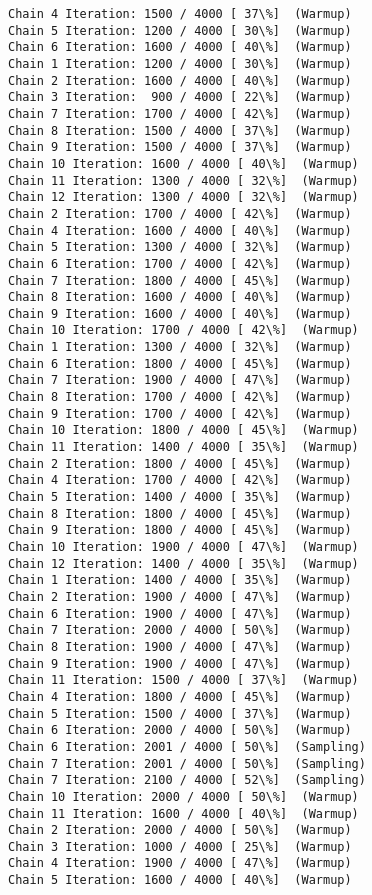 \documentclass[11pt]{article}
\begin{document}
\begin{Verbatim}[commandchars=\\\{\}]
Chain 4 Iteration: 1500 / 4000 [ 37\%]  (Warmup)
Chain 5 Iteration: 1200 / 4000 [ 30\%]  (Warmup)
Chain 6 Iteration: 1600 / 4000 [ 40\%]  (Warmup)
Chain 1 Iteration: 1200 / 4000 [ 30\%]  (Warmup)
Chain 2 Iteration: 1600 / 4000 [ 40\%]  (Warmup)
Chain 3 Iteration:  900 / 4000 [ 22\%]  (Warmup)
Chain 7 Iteration: 1700 / 4000 [ 42\%]  (Warmup)
Chain 8 Iteration: 1500 / 4000 [ 37\%]  (Warmup)
Chain 9 Iteration: 1500 / 4000 [ 37\%]  (Warmup)
Chain 10 Iteration: 1600 / 4000 [ 40\%]  (Warmup)
Chain 11 Iteration: 1300 / 4000 [ 32\%]  (Warmup)
Chain 12 Iteration: 1300 / 4000 [ 32\%]  (Warmup)
Chain 2 Iteration: 1700 / 4000 [ 42\%]  (Warmup)
Chain 4 Iteration: 1600 / 4000 [ 40\%]  (Warmup)
Chain 5 Iteration: 1300 / 4000 [ 32\%]  (Warmup)
Chain 6 Iteration: 1700 / 4000 [ 42\%]  (Warmup)
Chain 7 Iteration: 1800 / 4000 [ 45\%]  (Warmup)
Chain 8 Iteration: 1600 / 4000 [ 40\%]  (Warmup)
Chain 9 Iteration: 1600 / 4000 [ 40\%]  (Warmup)
Chain 10 Iteration: 1700 / 4000 [ 42\%]  (Warmup)
Chain 1 Iteration: 1300 / 4000 [ 32\%]  (Warmup)
Chain 6 Iteration: 1800 / 4000 [ 45\%]  (Warmup)
Chain 7 Iteration: 1900 / 4000 [ 47\%]  (Warmup)
Chain 8 Iteration: 1700 / 4000 [ 42\%]  (Warmup)
Chain 9 Iteration: 1700 / 4000 [ 42\%]  (Warmup)
Chain 10 Iteration: 1800 / 4000 [ 45\%]  (Warmup)
Chain 11 Iteration: 1400 / 4000 [ 35\%]  (Warmup)
Chain 2 Iteration: 1800 / 4000 [ 45\%]  (Warmup)
Chain 4 Iteration: 1700 / 4000 [ 42\%]  (Warmup)
Chain 5 Iteration: 1400 / 4000 [ 35\%]  (Warmup)
Chain 8 Iteration: 1800 / 4000 [ 45\%]  (Warmup)
Chain 9 Iteration: 1800 / 4000 [ 45\%]  (Warmup)
Chain 10 Iteration: 1900 / 4000 [ 47\%]  (Warmup)
Chain 12 Iteration: 1400 / 4000 [ 35\%]  (Warmup)
Chain 1 Iteration: 1400 / 4000 [ 35\%]  (Warmup)
Chain 2 Iteration: 1900 / 4000 [ 47\%]  (Warmup)
Chain 6 Iteration: 1900 / 4000 [ 47\%]  (Warmup)
Chain 7 Iteration: 2000 / 4000 [ 50\%]  (Warmup)
Chain 8 Iteration: 1900 / 4000 [ 47\%]  (Warmup)
Chain 9 Iteration: 1900 / 4000 [ 47\%]  (Warmup)
Chain 11 Iteration: 1500 / 4000 [ 37\%]  (Warmup)
Chain 4 Iteration: 1800 / 4000 [ 45\%]  (Warmup)
Chain 5 Iteration: 1500 / 4000 [ 37\%]  (Warmup)
Chain 6 Iteration: 2000 / 4000 [ 50\%]  (Warmup)
Chain 6 Iteration: 2001 / 4000 [ 50\%]  (Sampling)
Chain 7 Iteration: 2001 / 4000 [ 50\%]  (Sampling)
Chain 7 Iteration: 2100 / 4000 [ 52\%]  (Sampling)
Chain 10 Iteration: 2000 / 4000 [ 50\%]  (Warmup)
Chain 11 Iteration: 1600 / 4000 [ 40\%]  (Warmup)
Chain 2 Iteration: 2000 / 4000 [ 50\%]  (Warmup)
Chain 3 Iteration: 1000 / 4000 [ 25\%]  (Warmup)
Chain 4 Iteration: 1900 / 4000 [ 47\%]  (Warmup)
Chain 5 Iteration: 1600 / 4000 [ 40\%]  (Warmup)

\end{Verbatim}
\end{document}
